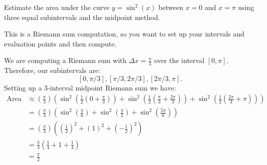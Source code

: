\documentclass{ximera}
\author{Emma Smith Zbarsky}
\begin{document}
\begin{exercise}

Estimate the area under the curve $y=\sin^2(x)$ between $x=0$ and
$x=\pi$ using three equal subintervals and the midpoint method.


\begin{hint}
This is a Riemann sum computation, so you want to set up your intervals
and evaluation points and then compute.
\end{hint}


\begin{hint}
We are computing a Riemann sum with $\Delta x = \frac{\pi}{3}$ over the
interval $[0,\pi]$. Therefore, our subintervals are:
\[[0,\pi/3], [\pi/3,2\pi/3], [2\pi/3,\pi].\] Setting up a 3-interval
midpoint Riemann sum we have: 
	\begin{align*}
\text{Area} &\approx \left(\frac{\pi}{3}\right)\left(\sin^2\left(\frac{1}{2}\left(0+\frac{\pi}{3}\right)\right)+\sin^2\left(\frac{1}{2}\left(\frac{\pi}{3}+\frac{2\pi}{3}\right)\right) + \sin^2\left(\frac{1}{2}\left(\frac{2\pi}{3}+\pi\right)\right)\right) \\
&= \left(\frac{\pi}{3}\right)\left(\sin^2\left(\frac{\pi}{6}\right)+\sin^2\left(\frac{\pi}{2}\right) + \sin^2\left(\frac{5\pi}{6}\right)\right) \\
&= \left(\frac{\pi}{3}\right)\left(\left(\frac{1}{2}\right)^2 + \left(1\right)^2 + \left(-\frac{1}{2}\right)^2\right) \\
&= \frac{\pi}{3}\left(\frac{1}{4}+1+\frac{1}{4}\right) \\
&= \boxed{\frac{\pi}{2}}
\end{align*}
\end{hint}


\begin{multipleChoice}
\end{multipleChoice}

\end{exercise}
\end{document}
